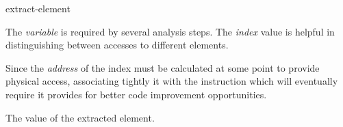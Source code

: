 \begin{instruction}{extract-element}

  \begin{notes}
    The \emph{variable} is required by several analysis steps.  The
    \emph{index} value is helpful in distinguishing between accesses
    to different elements.

    Since the \emph{address} of the index must be calculated at some
    point to provide physical access, associating tightly it with the
    instruction which will eventually require it provides for better
    code improvement opportunities.
  \end{notes}

  \begin{results}
  \item The value of the extracted element.
  \end{results}

  \begin{operands}
  \item {}
  \item {}
  \item {}
  \end{operands}

  \begin{seealso}
  \end{seealso}
\end{instruction}
